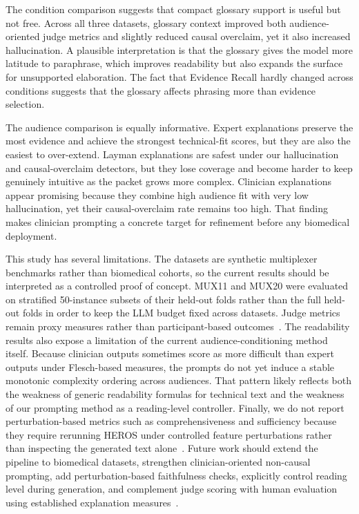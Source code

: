 \documentclass[sigconf,nonacm]{acmart}
\begin{document}
The condition comparison suggests that compact glossary support is useful but not free. Across all three datasets, glossary context improved both audience-oriented judge metrics and slightly reduced causal overclaim, yet it also increased hallucination. A plausible interpretation is that the glossary gives the model more latitude to paraphrase, which improves readability but also expands the surface for unsupported elaboration. The fact that Evidence Recall hardly changed across conditions suggests that the glossary affects phrasing more than evidence selection.

The audience comparison is equally informative. Expert explanations preserve the most evidence and achieve the strongest technical-fit scores, but they are also the easiest to over-extend. Layman explanations are safest under our hallucination and causal-overclaim detectors, but they lose coverage and become harder to keep genuinely intuitive as the packet grows more complex. Clinician explanations appear promising because they combine high audience fit with very low hallucination, yet their causal-overclaim rate remains too high. That finding makes clinician prompting a concrete target for refinement before any biomedical deployment.

This study has several limitations. The datasets are synthetic multiplexer benchmarks rather than biomedical cohorts, so the current results should be interpreted as a controlled proof of concept. MUX11 and MUX20 were evaluated on stratified 50-instance subsets of their held-out folds rather than the full held-out folds in order to keep the LLM budget fixed across datasets. Judge metrics remain proxy measures rather than participant-based outcomes~\cite{liu2023geval,huang2025judge}. The readability results also expose a limitation of the current audience-conditioning method itself. Because clinician outputs sometimes score as more difficult than expert outputs under Flesch-based measures, the prompts do not yet induce a stable monotonic complexity ordering across audiences. That pattern likely reflects both the weakness of generic readability formulas for technical text and the weakness of our prompting method as a reading-level controller. Finally, we do not report perturbation-based metrics such as comprehensiveness and sufficiency because they require rerunning HEROS under controlled feature perturbations rather than inspecting the generated text alone~\cite{deyoung2020eraser}. Future work should extend the pipeline to biomedical datasets, strengthen clinician-oriented non-causal prompting, add perturbation-based faithfulness checks, explicitly control reading level during generation, and complement judge scoring with human evaluation using established explanation measures~\cite{hoffman2023measures,holzinger2020scs}.
\end{document}
